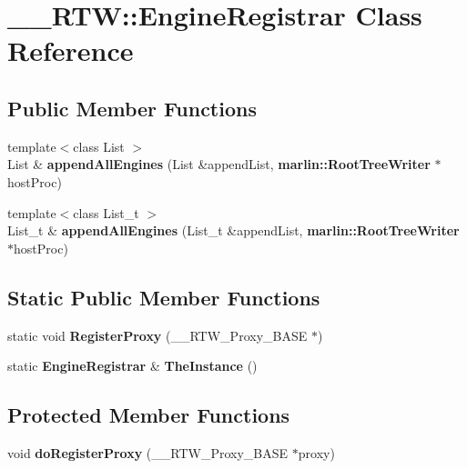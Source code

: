 \section{\-\_\-\-\_\-\-R\-T\-W\-:\-:Engine\-Registrar Class Reference}
\label{class____RTW_1_1EngineRegistrar}
\subsection*{Public Member Functions}
\begin{DoxyCompactItemize}
\item 
{\footnotesize template$<$class List $>$ }\\List \& {\bfseries append\-All\-Engines} (List \&append\-List, {\bf marlin\-::\-Root\-Tree\-Writer} $\ast$host\-Proc)\label{class____RTW_1_1EngineRegistrar_a3ea569c1a7f6a65ac5d42b3965f0a388}

\item 
{\footnotesize template$<$class List\-\_\-t $>$ }\\List\-\_\-t \& {\bf append\-All\-Engines} (List\-\_\-t \&append\-List, {\bf marlin\-::\-Root\-Tree\-Writer} $\ast$host\-Proc)
\end{DoxyCompactItemize}
\subsection*{Static Public Member Functions}
\begin{DoxyCompactItemize}
\item 
static void {\bfseries Register\-Proxy} (\-\_\-\-\_\-\-R\-T\-W\-\_\-\-Proxy\-\_\-\-B\-A\-S\-E $\ast$)\label{class____RTW_1_1EngineRegistrar_adf6c4241c68c96af4ca04a7807206019}

\item 
static {\bf Engine\-Registrar} \& {\bfseries The\-Instance} ()\label{class____RTW_1_1EngineRegistrar_a6d306ec70b08a954acea55fcf12af46e}

\end{DoxyCompactItemize}
\subsection*{Protected Member Functions}
\begin{DoxyCompactItemize}
\item 
void {\bf do\-Register\-Proxy} (\-\_\-\-\_\-\-R\-T\-W\-\_\-\-Proxy\-\_\-\-B\-A\-S\-E $\ast$proxy)
\end{DoxyCompactItemize}


